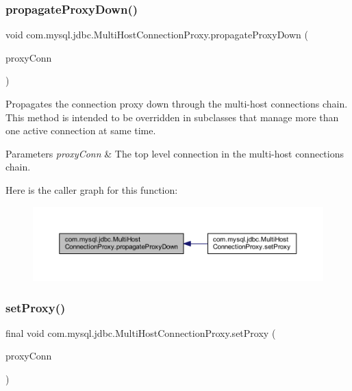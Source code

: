\subsubsection{\texorpdfstring{propagate\+Proxy\+Down()}{propagateProxyDown()}}
{\footnotesize\ttfamily void com.\+mysql.\+jdbc.\+Multi\+Host\+Connection\+Proxy.\+propagate\+Proxy\+Down (\begin{DoxyParamCaption}\item[{\mbox{\hyperlink{interfacecom_1_1mysql_1_1jdbc_1_1_my_s_q_l_connection}{My\+S\+Q\+L\+Connection}}}]{proxy\+Conn }\end{DoxyParamCaption})\hspace{0.3cm}{\ttfamily [protected]}}

Propagates the connection proxy down through the multi-\/host connections chain. This method is intended to be overridden in subclasses that manage more than one active connection at same time.


\begin{DoxyParams}{Parameters}
{\em proxy\+Conn} & The top level connection in the multi-\/host connections chain. \\
\hline
\end{DoxyParams}
Here is the caller graph for this function\+:
\nopagebreak
\begin{figure}[H]
\begin{center}
\leavevmode
\includegraphics[width=350pt]{classcom_1_1mysql_1_1jdbc_1_1_multi_host_connection_proxy_aa6770753b8f86d1d0680e1f97924c64c_icgraph}
\end{center}
\end{figure}
\mbox{\label{classcom_1_1mysql_1_1jdbc_1_1_multi_host_connection_proxy_aac045496f382b249b0fbbdf5d1163813}} 
\subsubsection{\texorpdfstring{set\+Proxy()}{setProxy()}}
{\footnotesize\ttfamily final void com.\+mysql.\+jdbc.\+Multi\+Host\+Connection\+Proxy.\+set\+Proxy (\begin{DoxyParamCaption}\item[{\mbox{\hyperlink{interfacecom_1_1mysql_1_1jdbc_1_1_my_s_q_l_connection}{My\+S\+Q\+L\+Connection}}}]{proxy\+Conn }\end{DoxyParamCaption})\hspace{0.3cm}{\ttfamily [protected]}}

